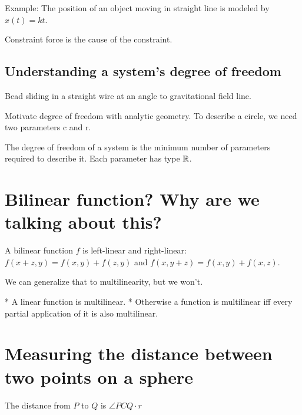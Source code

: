 Example:
The position of an object moving in straight line is modeled by \(x(t) = k t\).

Constraint force is the cause of the constraint.

\subsection{Understanding a system's degree of freedom}

Bead sliding in a straight wire at an angle to gravitational field line.

Motivate degree of freedom with analytic geometry.
To describe a circle, we need two parameters c and r.

The degree of freedom of a system is the minimum number of parameters required to describe it.
Each parameter has type \(\mathbb{R}\).


\section{Bilinear function? Why are we talking about this?}

A bilinear function \(f\) is left-linear and right-linear:
\(
f(x+z,y) = f(x,y) + f(z,y)
\)
and
\(
f(x,y+z) = f(x,y) + f(x,z)
\).

We can generalize that to multilinearity, but we won't.

* A linear function is multilinear.
* Otherwise a function is multilinear iff every partial application of it is also multilinear.

\section{Measuring the distance between two points on a sphere}

The distance from \(P\) to \(Q\) is \(\angle PCQ \cdot r\)
